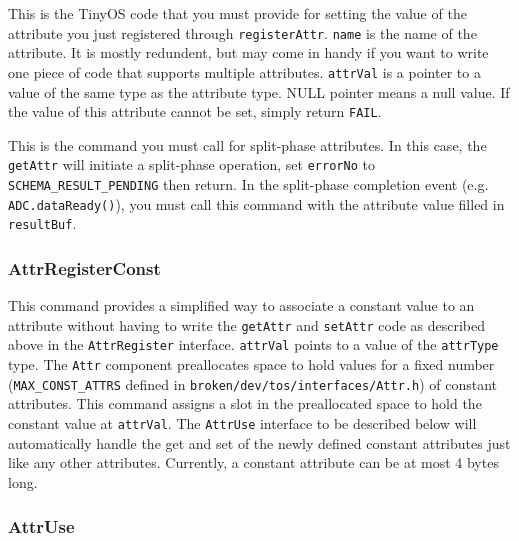 \documentclass[11pt]{article}
\newcommand{\docroot}{broken/dev}
\begin{document}

This is the TinyOS code that you must provide for setting the value of
the attribute you just registered through {\tt registerAttr}.
{\tt name} is
the name of the attribute.  It is mostly redundent, but may come in handy
if you want to write one piece of code that supports multiple attributes.
{\tt attrVal} is a pointer to a value of the same type as the attribute type.
NULL pointer means a null value.  If the value of this attribute cannot be set,
simply return {\tt FAIL}.



This is the command you must call for split-phase attributes.  In this case,
the {\tt getAttr} will initiate a split-phase operation, set {\tt *errorNo} to 
{\tt SCHEMA\_RESULT\_PENDING} then return.  In the split-phase completion event
(e.g. {\tt ADC.dataReady()}), you must call this command with the attribute
value filled in {\tt resultBuf}.

\subsubsection{AttrRegisterConst}


This command provides a simplified way to associate a constant value to an
attribute without having to write the {\tt getAttr} and {\tt setAttr} code
as described above in the {\tt AttrRegister} interface.  {\tt attrVal} points
to a value of the {\tt attrType} type.  The {\tt Attr}
component preallocates space to hold values for a fixed number
({\tt MAX\_CONST\_ATTRS} defined in {\tt \docroot/tos/interfaces/Attr.h})
of constant attributes.  This command assigns a slot in the preallocated
space to hold the constant value at {\tt attrVal}.  The {\tt AttrUse}
interface to be described below will automatically handle the get and set
of the newly defined constant attributes just like any other attributes.
Currently, a constant attribute can be at most 4 bytes long.

\subsubsection{AttrUse}
\label{sec:attruse}

\end{document}

